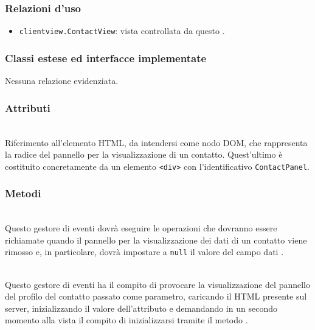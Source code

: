 \subsubsection*{Relazioni d'uso}
\begin{itemize}
  \item \texttt{clientview.ContactView}: vista controllata da questo .
\end{itemize}

\subsubsection*{Classi estese ed interfacce implementate}
Nessuna relazione evidenziata.

\subsubsection*{Attributi}
\begin{description}

  \item{}\\
  Riferimento all'elemento HTML, da intendersi come nodo DOM, che rappresenta la radice del pannello per la visualizzazione di un contatto. Quest'ultimo è costituito concretamente da un elemento \verb'<div>' con l'identificativo \verb'ContactPanel'.
  
\end{description}

\subsubsection*{Metodi}
\begin{description}

  \item{}\\
  Questo gestore di eventi dovrà eseguire le operazioni che dovranno essere richiamate quando il pannello per la visualizzazione dei dati di un contatto viene rimosso e, in particolare, dovrà impostare a \verb'null' il valore del campo dati .
  
  \item{}\\
  Questo gestore di eventi ha il compito di provocare la visualizzazione del pannello del profilo del contatto passato come parametro, caricando il  HTML presente sul server, inizializzando il valore dell'attributo  e demandando in un secondo momento alla vista il compito di inizializzarsi tramite il metodo .
  
\end{description}


